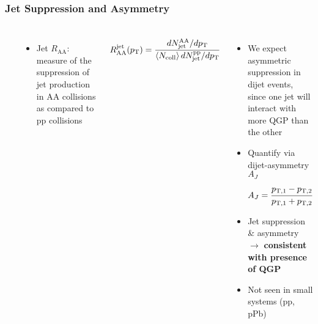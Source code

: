 \begin{frame}
  \frametitle{\textbf{Jet Suppression and Asymmetry}}
  \begin{columns}
    


    \

    

    \begin{itemize}
    \item Jet $R_{\text{AA}}$: measure of the suppression of jet production in AA collisions as compared to pp collisions
    \end{itemize}
    \begin{align*}
      R_{\text{AA}}^{\text{jet}} (p_{\text{T}}) = \cfrac{dN^{\text{AA}}_{\text{jet}} / dp_{\text{T}}}{\left< N_{\text{coll}} \right> dN^{\text{pp}}_{\text{jet}} / dp_{\text{T}}}
    \end{align*}
    \begin{itemize}
    \item We expect asymmetric suppression in dijet events, since one jet will interact with more QGP than the other
    \item Quantify via dijet-asymmetry $A_J$
      \begin{align*}
        A_J = \cfrac{p_{\text{T},1} - p_{\text{T},2}}{p_{\text{T},1} + p_{\text{T},2}}
      \end{align*}
    \item Jet suppression \& asymmetry $\to$ \textbf{consistent with presence of QGP}
    \item Not seen in small systems (pp, pPb)
    \end{itemize}
  \end{columns}

\end{frame}
